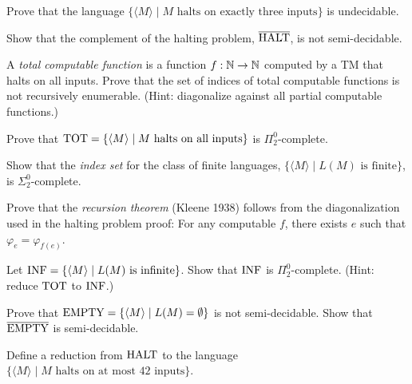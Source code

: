 \begin{exercise}[Basic]
Prove that the language $\{ \langle M \rangle \mid M \text{ halts on exactly three inputs} \}$ is undecidable.
\end{exercise}

\begin{exercise}[Basic]
Show that the complement of the halting problem, $\overline{\text{HALT}}$, is not semi-decidable.
\end{exercise}

\begin{exercise}[Intermediate]
A \emph{total computable function} is a function $f: \mathbb{N} \to \mathbb{N}$ computed by a TM that halts on all inputs. Prove that the set of indices of total computable functions is not recursively enumerable. (Hint: diagonalize against all partial computable functions.)
\end{exercise}

\begin{exercise}[Intermediate]
Prove that $\text{TOT} = \{ \langle M \rangle \mid M \text{ halts on all inputs} \}$ is $\Pi^0_2$-complete.
\end{exercise}

\begin{exercise}[Intermediate]
Show that the \emph{index set} for the class of finite languages, $\{ \langle M \rangle \mid L(M) \text{ is finite} \}$, is $\Sigma^0_2$-complete.
\end{exercise}

\begin{exercise}[Intermediate]
Prove that the \emph{recursion theorem} (Kleene 1938) follows from the diagonalization used in the halting problem proof: For any computable $f$, there exists $e$ such that $\varphi_e = \varphi_{f(e)}$.
\end{exercise}

\begin{exercise}[Intermediate]
Let $\text{INF} = \{ \langle M \rangle \mid L(M) \text{ is infinite} \}$. Show that $\text{INF}$ is $\Pi^0_2$-complete. (Hint: reduce $\text{TOT}$ to $\text{INF}$.)
\end{exercise}

\begin{exercise}[Intermediate]
Prove that $\text{EMPTY} = \{ \langle M \rangle \mid L(M) = \emptyset \}$ is not semi-decidable. Show that $\overline{\text{EMPTY}}$ is semi-decidable.
\end{exercise}

\begin{exercise}[Intermediate]
Define a reduction from $\text{HALT}$ to the language $\{ \langle M \rangle \mid M \text{ halts on at most 42 inputs} \}$.
\end{exercise}

